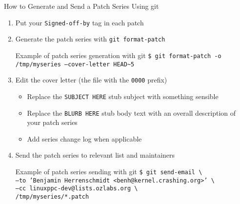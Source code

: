 \documentclass{beamer}
\begin{document}
\begin{frame}{How to Generate and Send a Patch Series Using git}
  \begin{enumerate}
  \item Put your \texttt{Signed-off-by} tag in each patch
  \item Generate the patch series with \texttt{git format-patch}
    \begin{exampleblock}{Example of patch series generation with git}
      \scriptsize\texttt{\$ git format-patch -o
        /tmp/myseries --cover-letter HEAD\textasciitilde5}
    \end{exampleblock}
  \item Edit the cover letter (the file with the \texttt{0000} prefix)
    \begin{itemize}
    \item Replace the \texttt{SUBJECT HERE} stub subject with something
      sensible
    \item Replace the \texttt{BLURB HERE} stub body text with an
      overall description of your patch series
    \item Add series change log when applicable
    \end{itemize}
  \item Send the patch series to relevant list and maintainers
    \begin{exampleblock}{Example of patch series sending with git}
      \scriptsize\texttt{\$ git send-email \textbackslash
        \\ \hspace{5mm} --to 'Benjamin Herrenschmidt
        <benh@kernel.crashing.org>' \textbackslash \\ \hspace{5mm}
        --cc linuxppc-dev@lists.ozlabs.org \textbackslash
        \\ \hspace{5mm} /tmp/myseries/*.patch}
    \end{exampleblock}
  \end{enumerate}
\end{frame}
\end{document}
